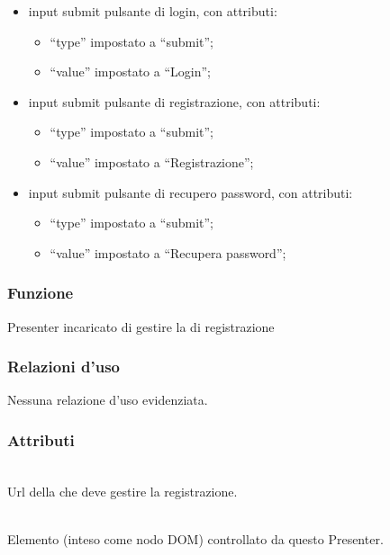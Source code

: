 \begin{description}
\begin{itemize}
\begin{itemize}
		\end{itemize}		
		\item input submit pulsante di login, con attributi:
		\begin{itemize}
			\item ``type'' impostato a ``submit'';
			\item ``value'' impostato a ``Login'';
		\end{itemize}
		\item input submit pulsante di registrazione, con attributi:
		\begin{itemize}
			\item ``type'' impostato a ``submit'';
			\item ``value'' impostato a ``Registrazione'';
		\end{itemize}
		\item input submit pulsante di recupero password, con attributi:
		\begin{itemize}
			\item ``type'' impostato a ``submit'';
			\item ``value'' impostato a ``Recupera password'';
		\end{itemize}
	\end{itemize}

\end{description}


\subsubsection*{Funzione}
Presenter incaricato di gestire la  di registrazione

\subsubsection*{Relazioni d'uso}

Nessuna relazione d'uso evidenziata.

\subsubsection*{Attributi}
\begin{description}

  \item{}\\
  Url della  che deve gestire la registrazione.
  \item{}\\
  Elemento (inteso come nodo DOM) controllato da questo Presenter.

\end{description}

